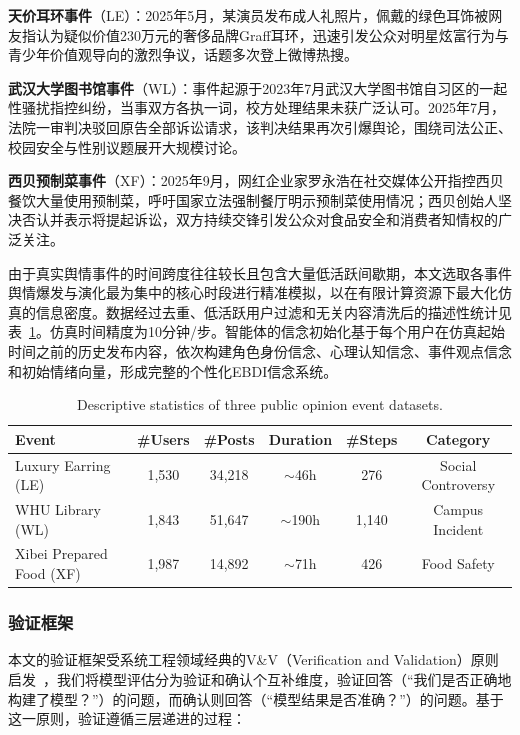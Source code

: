 \documentclass[a4paper,fleqn]{cas-sc}
\begin{document}
\textbf{天价耳环事件}（LE）：2025年5月，某演员发布成人礼照片，佩戴的绿色耳饰被网友指认为疑似价值230万元的奢侈品牌Graff耳环，迅速引发公众对明星炫富行为与青少年价值观导向的激烈争议，话题多次登上微博热搜。

\textbf{武汉大学图书馆事件}（WL）：事件起源于2023年7月武汉大学图书馆自习区的一起性骚扰指控纠纷，当事双方各执一词，校方处理结果未获广泛认可。2025年7月，法院一审判决驳回原告全部诉讼请求，该判决结果再次引爆舆论，围绕司法公正、校园安全与性别议题展开大规模讨论。

\textbf{西贝预制菜事件}（XF）：2025年9月，网红企业家罗永浩在社交媒体公开指控西贝餐饮大量使用预制菜，呼吁国家立法强制餐厅明示预制菜使用情况；西贝创始人坚决否认并表示将提起诉讼，双方持续交锋引发公众对食品安全和消费者知情权的广泛关注。

由于真实舆情事件的时间跨度往往较长且包含大量低活跃间歇期，本文选取各事件舆情爆发与演化最为集中的核心时段进行精准模拟，以在有限计算资源下最大化仿真的信息密度。数据经过去重、低活跃用户过滤和无关内容清洗后的描述性统计见表~\ref{tab:dataset}。仿真时间精度为10分钟/步。智能体的信念初始化基于每个用户在仿真起始时间之前的历史发布内容，依次构建角色身份信念、心理认知信念、事件观点信念和初始情绪向量，形成完整的个性化EBDI信念系统。

\begin{table}[!t]
\centering
\caption{Descriptive statistics of three public opinion event datasets.}
\label{tab:dataset}
\small
\renewcommand{\arraystretch}{1.05}
\begin{tabular}{@{}lccccc@{}}
\toprule
\textbf{Event} & \textbf{\#Users} & \textbf{\#Posts} & \textbf{Duration} & \textbf{\#Steps} & \textbf{Category} \\
\midrule
Luxury Earring (LE) & 1,530 & 34,218 & ${\sim}$46h & 276 & Social Controversy \\
WHU Library (WL) & 1,843 & 51,647 & ${\sim}$190h & 1,140 & Campus Incident \\
Xibei Prepared Food (XF) & 1,987 & 14,892 & ${\sim}$71h & 426 & Food Safety \\
\bottomrule
\end{tabular}
\end{table}

\subsubsection{验证框架}

本文的验证框架受系统工程领域经典的V\&V（Verification and Validation）原则启发~\citep{sargent_verification_2013}，我们将模型评估分为验证和确认个互补维度，验证回答（“我们是否正确地构建了模型？”）的问题，而确认则回答（“模型结果是否准确？”）的问题。基于这一原则，验证遵循三层递进的过程：
\end{document}
